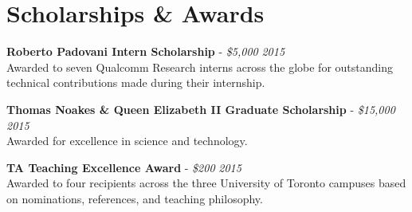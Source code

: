 \section{\sc Scholarships \& Awards}

\textbf{Roberto Padovani Intern Scholarship} - {\em \$5,000} \hfill {\em 2015} \\
Awarded to seven Qualcomm Research interns across the globe for outstanding technical contributions made during their internship.

\textbf{Thomas Noakes \& Queen Elizabeth II Graduate Scholarship} - {\em \$15,000} \hfill {\em 2015} \\
Awarded for excellence in science and technology.

\textbf{TA Teaching Excellence Award} - {\em \$200} \hfill {\em 2015} \\
Awarded to four recipients across the three University of Toronto campuses based on nominations, references, and teaching philosophy.
